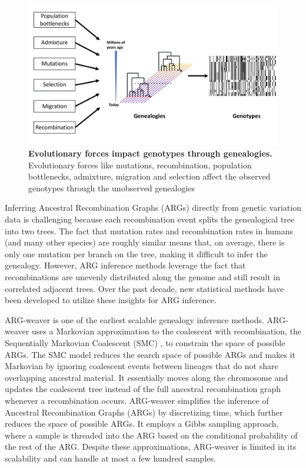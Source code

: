 \begin{figure}[h!]
    \centering
    \includegraphics[width=\linewidth]{figures/thesis_ghostbuster_intro.pdf}
    \caption{\textbf{Evolutionary forces impact genotypes through genealogies.} Evolutionary forces like mutations, recombination, population bottlenecks, admixture, migration and selection affect the observed genotypes through the unobserved genealogies}
    \label{fig:ghostbuster_intro}
\end{figure}

Inferring Ancestral Recombination Graphs (ARGs) directly from genetic variation data is challenging because each recombination event splits the genealogical tree into two trees. The fact that mutation rates and recombination rates in humans (and many other species) are roughly similar means that, on average, there is only one mutation per branch on the tree, making it difficult to infer the genealogy. However, ARG inference methods leverage the fact that recombinations are unevenly distributed along the genome and still result in correlated adjacent trees. Over the past decade, new statistical methods have been developed to utilize these insights for ARG inference. 

ARG-weaver \cite{rasmussen2014genome} is one of the earliest scalable genealogy inference methods. ARG-weaver uses a Markovian approximation to the coalescent with recombination, the Sequentially Markovian Coalescent (SMC) \cite{mcvean2005approximating}, to constrain the space of possible ARGs. The SMC model reduces the search space of possible ARGs and makes it Markovian by ignoring coalescent events between lineages that do not share overlapping ancestral material. It essentially moves along the chromosome and updates the coalescent tree instead of the full ancestral recombination graph whenever a recombination occurs. ARG-weaver simplifies the inference of Ancestral Recombination Graphs (ARGs) by discretizing time, which further reduces the space of possible ARGs. It employs a Gibbs sampling approach, where a sample is threaded into the ARG based on the conditional probability of the rest of the ARG. Despite these approximations, ARG-weaver is limited in its scalability and can handle at most a few hundred samples.

